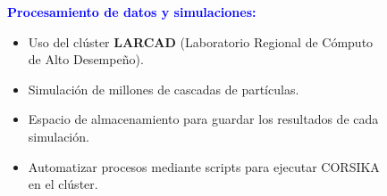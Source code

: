 
    \begin{frame}{} %
        \justifying %
        \vspace*{-0.2cm} %

        \begin{columns}
            \begin{column}{0.5\textwidth} %
                \textcolor{blue}{\textbf{Procesamiento de datos y simulaciones:}}
                \begin{itemize}
                    \item Uso del clúster \textbf{LARCAD} (Laboratorio Regional de Cómputo de Alto Desempeño).
                    \item Simulación de millones de cascadas de partículas.
                    \item Espacio de almacenamiento para guardar los resultados de cada simulación. 
                    \item Automatizar procesos mediante scripts para ejecutar CORSIKA en el clúster. 
                \end{itemize}                 
            \end{column}

            \begin{column}{0.3\textwidth} %
                \begin{figure}
                    
                \end{figure} 
            \end{column}
        \end{columns}
    \end{frame}


